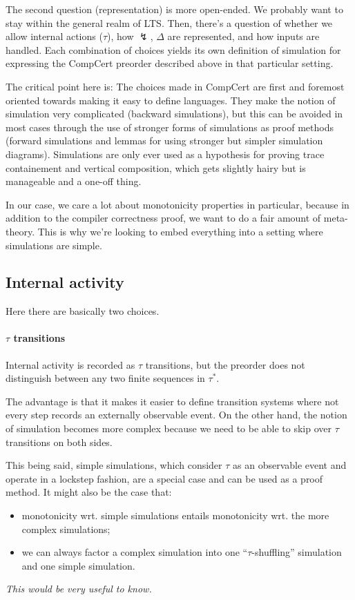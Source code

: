 \documentclass[11pt]{article}
\begin{document}
The second question (representation) is more open-ended.
We probably want to stay within the general realm of LTS.
Then, there's a question of
whether we allow internal actions ($\tau$),
how $\lightning$, $\Delta$ are represented,
and how inputs are handled.
Each combination of choices yields
its own definition of simulation for
expressing the CompCert preorder described above
in that particular setting.

The critical point here is:
The choices made in CompCert
are first and foremost oriented towards
making it easy to define languages.
They make the notion of simulation
very complicated (backward simulations),
but this can be avoided in most cases
through the use of stronger forms of simulations
as proof methods
(forward simulations and
lemmas for using stronger but simpler simulation diagrams).
Simulations are only ever used as a hypothesis
for proving trace containement
and vertical composition,
which gets slightly hairy but is manageable
and a one-off thing.

In our case,
we care a lot about monotonicity properties in particular,
because in addition to the compiler correctness proof,
we want to do a fair amount of meta-theory.
This is why we're looking to embed everything
into a setting where simulations are simple.


\subsection{Internal activity} %

Here there are basically two choices.

\paragraph{$\tau$ transitions}

Internal activity is recorded as $\tau$ transitions,
but the preorder does not distinguish
between any two finite sequences in $\tau^*$.

The advantage is that it makes it easier to define
transition systems where not every step
records an externally observable event.
On the other hand,
the notion of simulation becomes more complex
because we need to be able to skip over
$\tau$ transitions on both sides.

This being said, simple simulations,
which consider $\tau$ as an observable event
and operate in a lockstep fashion,
are a special case and can be used as a proof method.
It might also be the case that:
\begin{itemize}
  \item monotonicity wrt. simple simulations
    entails monotonicity wrt. the more complex simulations;
  \item we can always factor a complex simulation into
    one ``$\tau$-shuffling'' simulation and
    one simple simulation.
\end{itemize}
\emph{This would be very useful to know.}
\end{document}
